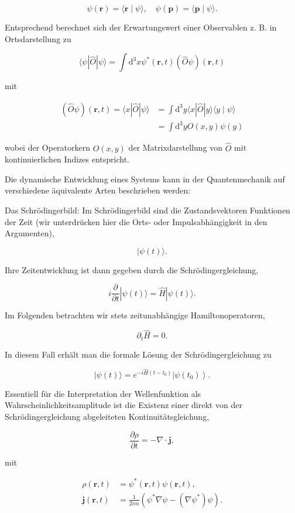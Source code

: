 \documentclass[10pt, letterpaper]{article}
\begin{document}
$$
\psi(\mathbf{r})=\langle\mathbf{r} \mid \psi\rangle, \quad \psi(\mathbf{p})=\langle\mathbf{p} \mid \psi\rangle .
$$

Entsprechend berechnet sich der Erwartungswert einer Observablen z. B. in Ortsdarstellung zu

$$
\langle\psi| \hat{O}|\psi\rangle=\int \mathrm{d}^{3} x \psi^{*}(\mathbf{r}, t)(\hat{O} \psi)(\mathbf{r}, t)
$$

mit

$$
\begin{aligned}
(\hat{O} \psi)(\mathbf{r}, t)=\langle x| \hat{O}|\psi\rangle & =\int \mathrm{d}^{3} y\langle x| \hat{O}|y\rangle\langle y \mid \psi\rangle \\
& =\int \mathrm{d}^{3} y O(x, y) \psi(y)
\end{aligned}
$$

wobei der Operatorkern $O(x, y)$ der Matrixdarstellung von $\hat{O}$ mit kontinuierlichen Indizes entspricht.

Die dynamische Entwicklung eines Systems kann in der Quantenmechanik auf verschiedene äquivalente Arten beschrieben werden:


Das Schrödingerbild: Im Schrödingerbild sind die Zustandsvektoren Funktionen der Zeit (wir unterdrücken hier die Orts- oder Impulsabhängigkeit in den Argumenten),

$$
|\psi(t)\rangle .
$$

Ihre Zeitentwicklung ist dann gegeben durch die Schrödingergleichung,

$$
i \frac{\partial}{\partial t}|\psi(t)\rangle=\hat{H}|\psi(t)\rangle .
$$

Im Folgenden betrachten wir stets zeitunabhängige Hamiltonoperatoren,

$$
\partial_{t} \hat{H}=0 .
$$

In diesem Fall erhält man die formale Lösung der Schrödingergleichung zu

$$
|\psi(t)\rangle=e^{-i \hat{H}\left(t-t_{0}\right)}\left|\psi\left(t_{0}\right)\right\rangle .
$$

Essentiell für die Interpretation der Wellenfunktion als Wahrscheinlichkeitsamplitude ist die Existenz einer direkt von der Schrödingergleichung abgeleiteten Kontinuitätsgleichung,

$$
\frac{\partial \rho}{\partial t}=-\nabla \cdot \mathbf{j},
$$

mit

$$
\begin{aligned}
\rho(\mathbf{r}, t) & =\psi^{*}(\mathbf{r}, t) \psi(\mathbf{r}, t), \\
\mathbf{j}(\mathbf{r}, t) & =\frac{1}{2 i m}\left(\psi^{*} \nabla \psi-\left(\nabla \psi^{*}\right) \psi\right) .
\end{aligned}
$$
\end{document}
